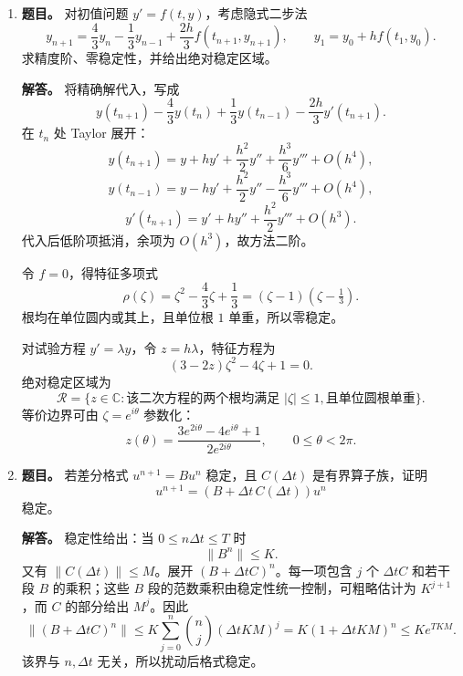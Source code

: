 ﻿\documentclass[UTF8,12pt]{ctexart}
\begin{document}
\begin{enumerate}[label=\textbf{\arabic*.},leftmargin=2.2em]
\textbf{解答。} 由谱分解，
\[
v^{(k)}=\alpha_1q_1+\sum_{j=2}^m \alpha_j\left(\frac{\lambda_j}{\lambda_1}\right)^kq_j.
\]
因为 \(|\lambda_j/\lambda_1|<1\)，第二项趋于 \(0\)，故极限为 \(\alpha_1q_1\)。误差
\[
e^{(k)}=v^{(k)}-\alpha_1q_1
\]
满足
\[
\|e^{(k)}\|^2
=|\alpha_2|^2\left|\frac{\lambda_2}{\lambda_1}\right|^{2k}
\sum_{j=3}^m |\alpha_j|^2\left|\frac{\lambda_j}{\lambda_1}\right|^{2k}.
\]
由于 \(|\lambda_j|<|\lambda_2|\) 对 \(j\ge3\) 成立，后面的和相对于第一项趋于 \(0\)。因此
\[
\lim_{k\to\infty}\frac{\|e^{(k+1)}\|}{\|e^{(k)}\|}
=\left|\frac{\lambda_2}{\lambda_1}\right|.
\]

\item \textbf{题目。} 对初值问题 \(y'=f(t,y)\)，考虑隐式二步法
\[
y_{n+1}=\frac43y_n-\frac13y_{n-1}+\frac{2h}{3}f(t_{n+1},y_{n+1}),
\qquad y_1=y_0+h f(t_1,y_0).
\]
求精度阶、零稳定性，并给出绝对稳定区域。

\textbf{解答。} 将精确解代入，写成
\[
y(t_{n+1})-\frac43y(t_n)+\frac13y(t_{n-1})-\frac{2h}{3}y'(t_{n+1}).
\]
在 \(t_n\) 处 Taylor 展开：
\[
y(t_{n+1})=y+hy'+\frac{h^2}{2}y''+\frac{h^3}{6}y'''+O(h^4),
\]
\[
y(t_{n-1})=y-hy'+\frac{h^2}{2}y''-\frac{h^3}{6}y'''+O(h^4),
\]
\[
y'(t_{n+1})=y'+hy''+\frac{h^2}{2}y'''+O(h^3).
\]
代入后低阶项抵消，余项为 \(O(h^3)\)，故方法二阶。

令 \(f=0\)，得特征多项式
\[
\rho(\zeta)=\zeta^2-\frac43\zeta+\frac13=(\zeta-1)(\zeta-\tfrac13).
\]
根均在单位圆内或其上，且单位根 \(1\) 单重，所以零稳定。

对试验方程 \(y'=\lambda y\)，令 \(z=h\lambda\)，特征方程为
\[
(3-2z)\zeta^2-4\zeta+1=0.
\]
绝对稳定区域为
\[
\mathcal R=\{z\in\mathbb C:\text{该二次方程的两个根均满足 }|\zeta|\le1,
\text{且单位圆根单重}\}.
\]
等价边界可由 \(\zeta=e^{i\theta}\) 参数化：
\[
z(\theta)=\frac{3e^{2i\theta}-4e^{i\theta}+1}{2e^{2i\theta}},
\qquad 0\le\theta<2\pi.
\]

\item \textbf{题目。} 若差分格式 \(u^{n+1}=Bu^n\) 稳定，且 \(C(\Delta t)\) 是有界算子族，证明
\[
u^{n+1}=(B+\Delta t\,C(\Delta t))u^n
\]
稳定。

\textbf{解答。} 稳定性给出：当 \(0\le n\Delta t\le T\) 时
\[
\|B^n\|\le K.
\]
又有 \(\|C(\Delta t)\|\le M\)。展开 \((B+\Delta t C)^n\)。每一项包含 \(j\) 个 \(\Delta t C\) 和若干段 \(B\) 的乘积；这些 \(B\) 段的范数乘积由稳定性统一控制，可粗略估计为 \(K^{j+1}\)，而 \(C\) 的部分给出 \(M^j\)。因此
\[
\|(B+\Delta t C)^n\|
\le K\sum_{j=0}^n {n\choose j}(\Delta t KM)^j
=K(1+\Delta t KM)^n
\le K e^{TKM}.
\]
该界与 \(n,\Delta t\) 无关，所以扰动后格式稳定。


\end{enumerate}
\end{document}
